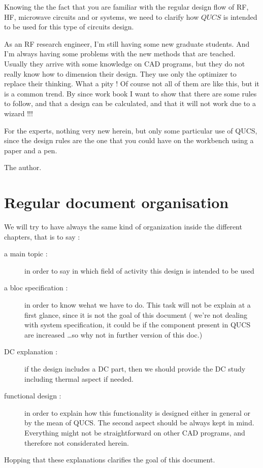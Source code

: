 %
%
%
%


Knowing the the fact that you are familiar with the regular design flow of RF, HF, microwave circuits and or systems, we need to clarify how $QUCS$ is intended to be used for this type of circuits design.
 
\bigskip

As an RF research engineer, I'm still having some new graduate students. And I'm always having some problems with the new methods that are teached. Usually they arrive with some knowledge on CAD programs, but they do not really know how to dimension their design. They use only the optimizer to replace their thinking. What a pity ! Of course not all of them are like this, but it is a common trend.  By since work book I want to show that there are some rules to follow, and that a design can be calculated, and that it will not work due to a wizard !!!

\bigskip

For the experts, nothing very new herein, but only some particular use of QUCS, since the design rules are the one that you could have on the workbench using a paper and a pen.

\bigskip

The author.

\section*{Regular document organisation}
We will try to have always the same kind of organization inside the different chapters, that is to say :

\begin{description}
\item[a main topic : ] in order to say in which field of activity this design is intended to be used
\item[a bloc specification : ] in order to know wehat we have to do. This task will not be explain at a first glance, since it is not the goal of this document ( we're not dealing with system specification, it could be if the component present in QUCS are increased \ldots so why not in further version of this doc.)
\item[DC explanation : ] if the design includes a DC part, then we should provide the DC study including thermal aspect if needed.
\item[functional design : ] in order to explain how this functionality is designed either in general or by the mean of QUCS. The second aspect should be always kept in mind. Everything might not be straightforward on other CAD programs, and therefore not considerated herein.
\end{description}

\bigskip

Hopping that these explanations clarifies the goal of this document.
